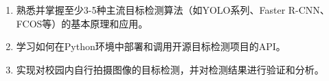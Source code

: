 \begin{enumerate}
    \item 熟悉并掌握至少3-5种主流目标检测算法（如YOLO系列、Faster R-CNN、FCOS等）的基本原理和应用。
    \item 学习如何在Python环境中部署和调用开源目标检测项目的API。
    \item 实现对校园内自行拍摄图像的目标检测，并对检测结果进行验证和分析。
\end{enumerate}

